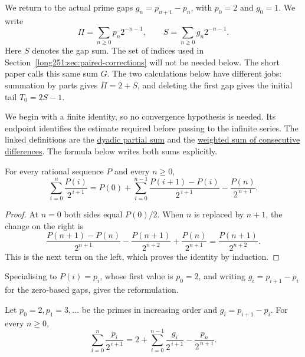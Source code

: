 We return to the actual prime gaps
$g_n=p_{n+1}-p_n$, with $p_0=2$ and $g_0=1$.  We write
\[
 \Pi=\sum_{n\ge0}p_n2^{-n-1},\qquad
 S=\sum_{n\ge0}g_n2^{-n-1}.
\]
Here $S$ denotes the gap sum.  The set of indices used in
Section~\ref{long251:sec:paired-corrections} will not be needed below.
The short paper calls this same sum $G$.  The two calculations below
have different jobs: summation by parts gives $\Pi=2+S$, and deleting
the first gap gives the initial tail $T_0=2S-1$.

We begin with a finite identity, so no convergence hypothesis is needed.
Its endpoint identifies the estimate required before passing to the
infinite series.  The linked definitions are the
\href{https://github.com/wcook04/plectis-erdos/blob/3d6d938d696fed0fb71dd55115a18a73738ff223/lean/ErdosProblems/Erdos251/PrimeGapDyadicTail.lean\#L101}{dyadic partial sum}
and the
\href{https://github.com/wcook04/plectis-erdos/blob/3d6d938d696fed0fb71dd55115a18a73738ff223/lean/ErdosProblems/Erdos251/PrimeGapDyadicTail.lean\#L121}{weighted sum of consecutive differences}.
The formula below writes both sums explicitly.

\begin{proposition}\label{long251:res:abel}
For every rational sequence $P$ and every $n\ge0$,
\[
 \sum_{i=0}^{n}\frac{P(i)}{2^{\,i+1}}
 =P(0)+\sum_{i=0}^{n-1}\frac{P(i+1)-P(i)}{2^{\,i+1}}
       -\frac{P(n)}{2^{\,n+1}} .
\]
\end{proposition}

\begin{proof}
At $n=0$ both sides equal $P(0)/2$.  When $n$ is replaced by $n+1$,
the change on the right is
\[
 \frac{P(n+1)-P(n)}{2^{n+1}}
 -\frac{P(n+1)}{2^{n+2}}+\frac{P(n)}{2^{n+1}}
 =\frac{P(n+1)}{2^{n+2}}.
\]
This is the next term on the left, which proves the identity by induction.
\end{proof}

Specialising to $P(i)=p_i$, whose first value is $p_0=2$, and writing
$g_i=p_{i+1}-p_i$ for the zero-based gaps, gives the reformulation.

\begin{theorem}\label{long251:res:parts}
Let $p_0=2,p_1=3,\ldots$ be the primes in increasing order and
$g_i=p_{i+1}-p_i$.  For every $n\ge0$,
\[
 \sum_{i=0}^{n}\frac{p_i}{2^{\,i+1}}
 =2+\sum_{i=0}^{n-1}\frac{g_i}{2^{\,i+1}}-\frac{p_n}{2^{\,n+1}} .
\]
\end{theorem}

